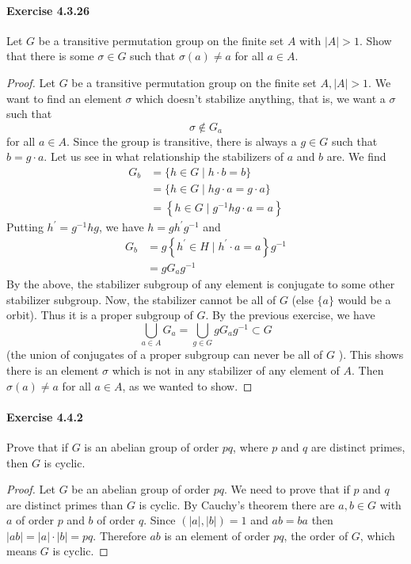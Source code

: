 \documentclass{article}
\theoremstyle{definition}
\begin{document}
\paragraph{Exercise 4.3.26} Let $G$ be a transitive permutation group on the finite set $A$ with $|A|>1$. Show that there is some $\sigma \in G$ such that $\sigma(a) \neq a$ for all $a \in A$.
\begin{proof}
    Let $G$ be a transitive permutation group on the finite set $A,|A|>1$. We want to find an element $\sigma$ which doesn't stabilize anything, that is, we want a $\sigma$ such that
$$
\sigma \notin G_a
$$
for all $a \in A$.
Since the group is transitive, there is always a $g \in G$ such that $b=g \cdot a$. Let us see in what relationship the stabilizers of $a$ and $b$ are. We find
$$
\begin{aligned}
G_b & =\{h \in G \mid h \cdot b=b\} \\
& =\{h \in G \mid h g \cdot a=g \cdot a\} \\
& =\left\{h \in G \mid g^{-1} h g \cdot a=a\right\}
\end{aligned}
$$
Putting $h^{\prime}=g^{-1} h g$, we have $h=g h^{\prime} g^{-1}$ and
$$
\begin{aligned}
G_b & =g\left\{h^{\prime} \in H \mid h^{\prime} \cdot a=a\right\} g^{-1} \\
& =g G_a g^{-1}
\end{aligned}
$$
By the above, the stabilizer subgroup of any element is conjugate to some other stabilizer subgroup. Now, the stabilizer cannot be all of $G$ (else $\{a\}$ would be a orbit). Thus it is a proper subgroup of $G$. By the previous exercise, we have
$$
\bigcup_{a \in A} G_a=\bigcup_{g \in G} g G_a g^{-1} \subset G
$$
(the union of conjugates of a proper subgroup can never be all of $G$ ). This shows there is an element $\sigma$ which is not in any stabilizer of any element of $A$. Then $\sigma(a) \neq a$ for all $a \in A$, as we wanted to show.
\end{proof}



\paragraph{Exercise 4.4.2} Prove that if $G$ is an abelian group of order $p q$, where $p$ and $q$ are distinct primes, then $G$ is cyclic.
\begin{proof}
    Let $G$ be an abelian group of order $p q$. We need to prove that if $p$ and $q$ are distinct primes than $G$ is cyclic. By Cauchy's theorem there are $a, b \in G$ with $a$ of order $p$ and $b$ of order $q$. Since $(|a|,|b|)=1$ and $a b=b a$ then $|a b|=|a| \cdot|b|=p q$. Therefore $a b$ is an element of order $p q$, the order of $G$, which means $G$ is cyclic.
\end{proof}
\end{document}
